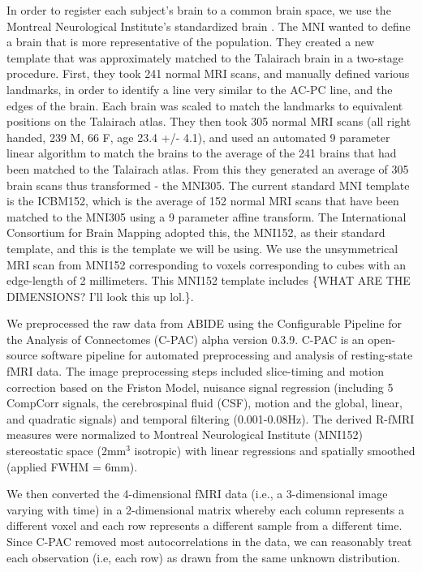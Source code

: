 {In order to register each subject's brain to a common brain space, we
use the Montreal Neurological Institute's standardized brain
\cite{evans19933d,collins1994automatic}.
The MNI wanted to define a brain that is more representative of the
population. They created a new template that was approximately matched
to the Talairach brain in a two-stage procedure. First, they took 241
normal MRI scans, and manually defined various landmarks, in order to
identify a line very similar to the AC-PC line, and the edges of the
brain. Each brain was scaled to match the landmarks to equivalent
positions on the Talairach atlas. They then took 305 normal MRI scans
(all right handed, 239 M, 66 F, age 23.4 +/- 4.1), and used an
automated 9 parameter linear algorithm to match the brains to the
average of the 241 brains that had been matched to the Talairach atlas.
From this they generated an average of 305 brain scans thus transformed
- the MNI305. The current standard MNI template is the ICBM152, which
is the average of 152 normal MRI scans  that have been matched to the
MNI305 using a 9 parameter affine transform. The International
Consortium for Brain Mapping adopted this, the MNI152, as their
standard template, and this is the template we will be using. We use
the unsymmetrical MRI scan from MNI152 corresponding to voxels
corresponding to cubes with an edge-length of 2 millimeters. This
MNI152 template includes \{WHAT ARE THE DIMENSIONS? I'll look this up
lol.\}.

We preprocessed the raw data from ABIDE using the Configurable Pipeline
for the Analysis of Connectomes (C-PAC) alpha version 0.3.9. C-PAC is
an open-source software pipeline for automated preprocessing and
analysis of resting-state fMRI data. The image preprocessing steps
included slice-timing and motion correction based on the Friston Model,
nuisance signal regression (including 5 CompCorr signals, the
cerebrospinal fluid (CSF), motion and the global, linear, and quadratic
signals) and temporal filtering (0.001-0.08Hz). The derived R-fMRI
measures were normalized to Montreal Neurological Institute (MNI152)
stereostatic space (2mm$^3$ isotropic) with linear regressions and
spatially smoothed (applied FWHM = 6mm).

We then converted the 4-dimensional fMRI data (i.e., a 3-dimensional
image varying with time) in a 2-dimensional matrix whereby each column
represents a different voxel and each row represents a different sample
from a different time. Since C-PAC removed most autocorrelations in the
data, we can reasonably treat each observation (i.e, each row) as drawn
from the same unknown distribution.
}

